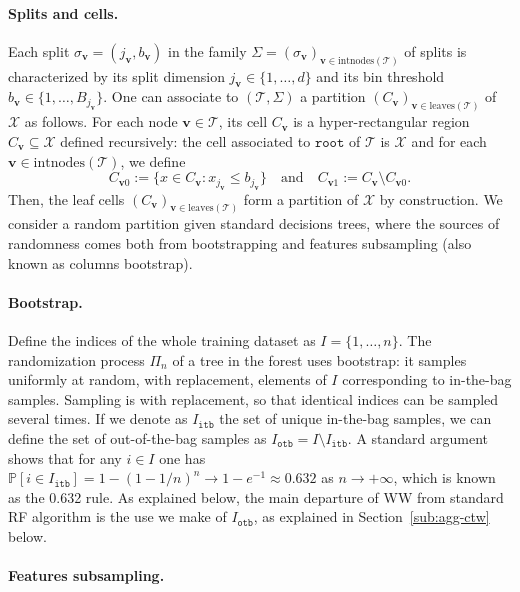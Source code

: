 \documentclass{article}
\renewcommand{\leq}{\leqslant}
\newcommand{\cX}{\mathcal X}
\newcommand{\otb}{\mathtt{otb}}
\newcommand{\itb}{\mathtt{itb}}
\renewcommand{\P}{\mathbb P}
\newcommand{\splits}{\Sigma} %
\newcommand{\asplit}{\sigma} %
\newcommand{\node}{\mathbf{v}} %
\newcommand{\inodes}{\mathrm{intnodes}} %
\newcommand{\leaves}{\mathrm{leaves}} %
\newcommand{\leaf}{\node}%
\newcommand{\cell}{C}
\renewcommand{\root}{\mathtt{root}} %
\newcommand{\tree}{\mathcal{T}} %
\begin{document}
\paragraph{Splits and cells.} 

Each split $\sigma_\node = (j_\node, b_\node)$ in the family $\splits = (\asplit_\node)_{\node \in \inodes (\tree)}$ of splits is characterized by its split dimension $j_\node \in \{ 1, \dots, d \}$ and its bin threshold $b_\node \in \{ 1, \ldots, B_{j_\node} \}$.
One can associate to $(\tree, \splits)$ a partition $(\cell_{\leaf})_{\leaf \in \leaves  (\tree)}$ of $\cX$ as follows.
For each node $\node \in \tree$, its cell $\cell_\node$ is 
a hyper-rectangular region $\cell_\node \subseteq \cX$ defined recursively: the cell associated to $\root$ of $\tree$ is $\cX$ and for each $\node \in \inodes(\tree)$, we define
\begin{equation}
  \label{eq:cell-split-definition}
  \cell_{\node 0} := \{ x \in \cell_\node : x_{j_\node} \leq b_{j_\node}  \} \quad \text{and} \quad \cell_{\node 1} := \cell_\node \setminus \cell_{\node 0}.
\end{equation}
Then, the leaf cells $(\cell_{\leaf})_{\leaf \in \leaves (\tree)}$ form a partition of $\cX$ by construction.
We consider a random partition given standard decisions trees, where the sources of randomness comes both from bootstrapping and features subsampling (also known as columns bootstrap).

\paragraph{Bootstrap.}

Define the indices of the whole training dataset as $I = \{1, \ldots, n\}$. 
The randomization process $\Pi_n$ of a tree in the forest uses bootstrap: it samples uniformly at random, with replacement, elements of $I$ corresponding to in-the-bag samples.
Sampling is with replacement, so that identical indices can be sampled several times.
If we denote as $I_\itb$ the set of unique in-the-bag samples, we can define the set of out-of-the-bag samples as $I_\otb = I \setminus I_\itb$.
A standard argument shows that for any $i \in I$ one has $\P[i \in I_\itb] = 1 - (1 - 1/n)^n \rightarrow 1 - e^{-1} \approx 0.632$ as $n \rightarrow +\infty$, which is known as the 0.632 rule.
As explained below, the main departure of WW from standard RF algorithm is the use we make of $I_\otb$, as explained in Section~\ref{sub:agg-ctw} below.

\paragraph{Features subsampling.}
\end{document}
